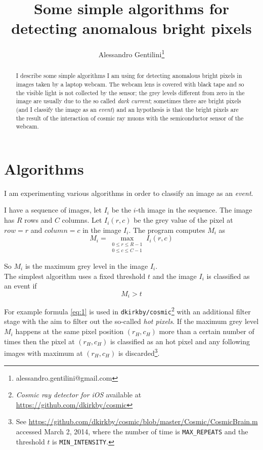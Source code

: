 \documentclass[a4paper,12pt]{article}
\title{Some simple algorithms for detecting anomalous bright pixels}
\author{Alessandro Gentilini\thanks{alessandro.gentilini@gmail.com}}
\begin{document}
\maketitle

\begin{abstract}
I describe some simple algorithms I am using for detecting anomalous bright 
pixels in images taken by a laptop webcam.
The webcam lens is covered with black tape and so the visible light is not 
collected by the sensor; the grey levels different from zero in the image are 
usually due to the so called \emph{dark current}; sometimes there are bright 
pixels (and I classify the image as an \emph{event}) and an hypothesis is that 
the bright pixels are the result of the interaction of cosmic ray muons with the 
semiconductor sensor of the webcam.
\end{abstract} 

\section{Algorithms}
I am experimenting various algorithms in order to classify an image as an 
\emph{event}.

I have a sequence of images, let $I_i$ be the $i$-th image in the sequence. The 
image has $R$ rows and $C$ columns. Let $I_i(r,c)$ be the grey value of the pixel 
at $row=r$ and $column=c$ in the image $I_i$.
The program computes $M_i$ as 
$$M_i=\max_{\substack{
   0\leq r\leq R-1 \\
   0\leq c\leq C-1
  }}
 I_i(r,c)$$

So $M_i$ is the maximum grey level in the image $I_i$.\\

The simplest algorithm uses a fixed threshold $t$ and the image $I_i$ is 
classified as an event if 
\begin{equation}
M_i>t \label{eq:1}
\end{equation}

For example formula \ref{eq:1} is used in 
\texttt{dkirkby/cosmic}\footnote{\emph{Cosmic ray detector for iOS} available at 
\url{https://github.com/dkirkby/cosmic}} with an additional filter stage with 
the aim to filter out the so-called \emph{hot pixels}. If the maximum grey level 
$M_i$ happens at the same pixel position $(r_H,c_H)$ more than a certain number 
of times then the pixel at $(r_H,c_H)$ is classified as an hot pixel and any 
following images with maximum at $(r_H,c_H)$ is discarded\footnote{See 
\url{https://github.com/dkirkby/cosmic/blob/master/Cosmic/CosmicBrain.m} 
accessed March 2, 2014, where the number of time is \texttt{MAX\_REPEATS} 
and the threshold $t$ is \texttt{MIN\_INTENSITY}.}.\\
\end{document}
